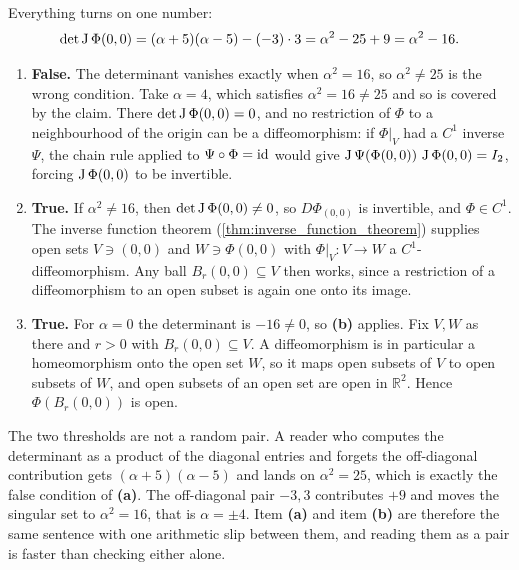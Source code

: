\begin{exercisesolution}
\label{sol:local_diffeo_parameter_alpha}
Everything turns on one number:
\[\det\operatorname{J}\Phi(0,0) = (\alpha+5)(\alpha-5) - (-3)\cdot 3 = \alpha^2 - 25 + 9 = \alpha^2 - 16 .\]
\begin{enumerate}[label=\textbf{(\alph*)}]
  \item \textbf{False.} The determinant vanishes exactly when $\alpha^2 = 16$, so $\alpha^2 \neq 25$
    is the wrong condition. Take $\alpha = 4$, which satisfies $\alpha^2 = 16 \neq 25$ and so is
    covered by the claim. There $\det\operatorname{J}\Phi(0,0) = 0$, and no restriction of $\Phi$ to a
    neighbourhood of the origin can be a diffeomorphism: if $\Phi|_V$ had a $C^1$ inverse $\Psi$,
    the chain rule applied to $\Psi\circ\Phi = \operatorname{id}$ would give
    $\operatorname{J}\Psi(\Phi(0,0))\,\operatorname{J}\Phi(0,0) = I_2$, forcing $\operatorname{J}\Phi(0,0)$ to be invertible.
  \item \textbf{True.} If $\alpha^2 \neq 16$, then $\det\operatorname{J}\Phi(0,0) \neq 0$, so
    $D\Phi_{(0,0)}$ is invertible, and $\Phi \in C^1$. The inverse function theorem
    (\cref{thm:inverse_function_theorem}) supplies open sets $V \ni (0,0)$ and $W \ni \Phi(0,0)$
    with $\Phi|_V : V \to W$ a $C^1$-diffeomorphism. Any ball $B_r(0,0) \subseteq V$ then works,
    since a restriction of a diffeomorphism to an open subset is again one onto its image.
  \item \textbf{True.} For $\alpha = 0$ the determinant is $-16 \neq 0$, so \textbf{(b)} applies.
    Fix $V, W$ as there and $r > 0$ with $B_r(0,0) \subseteq V$. A diffeomorphism is in particular
    a homeomorphism onto the open set $W$, so it maps open subsets of $V$ to open subsets of $W$,
    and open subsets of an open set are open in $\mathbb{R}^2$. Hence $\Phi(B_r(0,0))$ is open.
\end{enumerate}
\begin{remark}
The two thresholds are not a random pair. A reader who computes the determinant as a product of
the diagonal entries and forgets the off-diagonal contribution gets $(\alpha+5)(\alpha-5)$ and
lands on $\alpha^2 = 25$, which is exactly the false condition of \textbf{(a)}. The off-diagonal
pair $-3, 3$ contributes $+9$ and moves the singular set to $\alpha^2 = 16$, that is
$\alpha = \pm4$. Item \textbf{(a)} and item \textbf{(b)} are therefore the same sentence with one
arithmetic slip between them, and reading them as a pair is faster than checking either alone.
\end{remark}
\end{exercisesolution}

